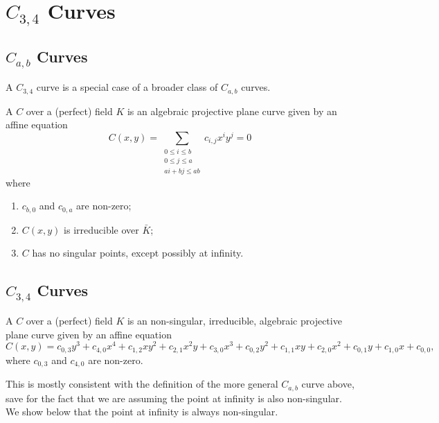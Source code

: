 
\section{$C_{3,4}$ Curves}
\label{chap_curves}



\subsection{$C_{a,b}$ Curves}

A $C_{3,4}$ curve is a special case of a broader class of $C_{a,b}$ curves.

\begin{definition}
  A  $C$ over a (perfect) field $K$
  is an algebraic projective plane curve
  given by an affine equation
  \[ C(x,y) = \sum_{\substack{0 \leq i \leq b \\ 0 \leq j \leq a \\ ai + bj \leq ab }}c_{i,j}x^iy^j = 0 \]
  where
  \begin{enumerate}[label=(\roman*)]
    \item $c_{b,0}$ and $c_{0,a}$ are non-zero;
    \item $C(x,y)$ is irreducible over $\bar K$;
    \item $C$ has no singular points, except possibly at infinity.
  \end{enumerate}
\end{definition}



\subsection{$C_{3,4}$ Curves}

\begin{definition}
  A  $C$ over a (perfect) field $K$
  is an non-singular, irreducible, algebraic projective plane curve
  given by an affine equation
  \[ C(x,y) = c_{0,3}y^3 + c_{4,0}x^4 + c_{1,2}xy^2 + c_{2,1}x^2y + c_{3,0}x^3 + c_{0,2}y^2 + c_{1,1}xy + c_{2,0}x^2 + c_{0,1}y + c_{1,0}x + c_{0,0}, \]
  where $c_{0,3}$ and $c_{4,0}$ are non-zero.
\end{definition}
This is mostly consistent with the definition of the more general $C_{a,b}$ curve above,
save for the fact that we are assuming the point at infinity is also non-singular.
We show below that the point at infinity is always non-singular.

